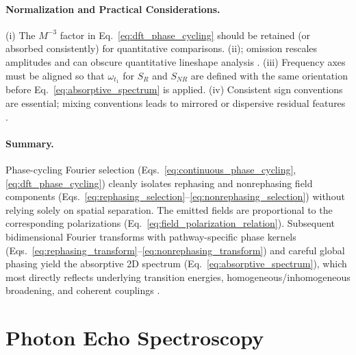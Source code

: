 \paragraph{Normalization and Practical Considerations.}
\noindent (i) The $M^{-3}$ factor in Eq.~\eqref{eq:dft_phase_cycling} should be retained (or absorbed consistently) for quantitative comparisons. (ii); omission rescales amplitudes and can obscure quantitative lineshape analysis \cite{cho2009twodimensionalopticalspectroscopy, greenetal2024vibrationalcoherenceshalfbroadband}. (iii) Frequency axes must be aligned so that $\omega_{t_1}$ for $S_{R}$ and $S_{NR}$ are defined with the same orientation before Eq.~\eqref{eq:absorptive_spectrum} is applied. (iv) Consistent sign conventions are essential; mixing conventions leads to mirrored or dispersive residual features \cite{mukamel1995principlesnonlinearoptical, cho2009twodimensionalopticalspectroscopy, greenetal2024vibrationalcoherenceshalfbroadband}.

\paragraph{Summary.}
\noindent Phase-cycling Fourier selection (Eqs.~\eqref{eq:continuous_phase_cycling}, \eqref{eq:dft_phase_cycling}) cleanly isolates rephasing and nonrephasing field components (Eqs.~\eqref{eq:rephasing_selection}--\eqref{eq:nonrephasing_selection}) without relying solely on spatial separation. The emitted fields are proportional to the corresponding polarizations (Eq.~\eqref{eq:field_polarization_relation}). Subsequent bidimensional Fourier transforms with pathway-specific phase kernels (Eqs.~\eqref{eq:rephasing_transform}--\eqref{eq:nonrephasing_transform}) and careful global phasing yield the absorptive 2D spectrum (Eq.~\eqref{eq:absorptive_spectrum}), which most directly reflects underlying transition energies, homogeneous/inhomogeneous broadening, and coherent couplings \cite{mukamel1995principlesnonlinearoptical, cho2009twodimensionalopticalspectroscopy, greenetal2024vibrationalcoherenceshalfbroadband}.


\section{Photon Echo Spectroscopy}
\label{sec:photon_echo}

